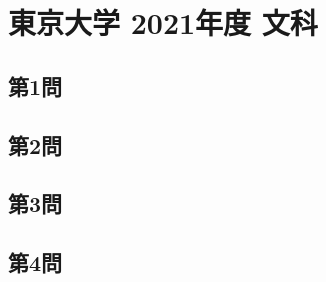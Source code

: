 ﻿\documentclass[../../uem_tok_q.tex]{subfiles}
\begin{document}
    \section{東京大学 2021年度 文科}

    \subsection{第1問}
    

    \vfill
    \subsection{第2問}
    

    \vfill
    \newpage
    \subsection{第3問}
    

    \vfill
    \subsection{第4問}
    

    \vfill
\end{document}
